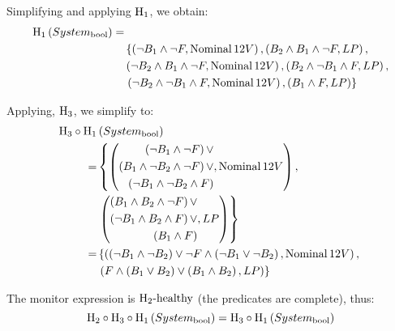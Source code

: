 Simplifying and applying $\healthiness[1]$, we obtain:
%
\[
\begin{split}
\healthinessfun[1]{System_{\mathrm{bool}}} = &\\
  & \left\{ 
      \left(\lnot B_1 \land \lnot F, \Nominal{12V}\right), 
      \left(B_2 \land B_1 \land \lnot F, LP\right),\right.\\
  &   \left(\lnot B_2 \land B_1 \land \lnot F, \Nominal{12V}\right), 
      \left(B_2 \land \lnot B_1 \land F, LP\right), \\
  &   \left.\left(\lnot B_2 \land \lnot B_1 \land F, \Nominal{12V}\right),
      \left(B_1 \land F, LP\right)\right\}
\end{split}
\]

Applying, $\healthiness[3]$, we simplify to:
%
\[
\begin{split}
\healthiness[3] \circ \healthiness[1] &\left(System_{\mathrm{bool}}\right)\\
=  & \left\{ 
      \left(
        \begin{split}
          \left(\lnot B_1 \land \lnot F\right) \lor\\
          \left(B_1 \land \lnot B_2 \land \lnot F \right)\lor \\
          \left(\lnot B_1 \land \lnot B_2 \land F \right)
        \end{split},
        \Nominal{12V}
      \right),
    \right.\\
  & \left.
      \left(
        \begin{split}
        \left(B_1 \land B_2 \land \lnot F\right) \lor \\
        \left(\lnot B_1 \land B_2 \land F\right) \lor \\
        \left(B_1 \land F\right)
        \end{split}, 
        LP
      \right)
    \right\}\\
= & \left\{
    \left(\left(\lnot B_1 \land \lnot B_2\right) \lor 
      \lnot F \land \left(\lnot B_1 \lor \lnot B_2\right), 
      \Nominal{12V}\right), \right.\\
  & \left.  
    \left(F \land \left(B_1 \lor B_2\right) \lor \left(B_1 \land B_2\right), 
      LP\right)
  \right\}
\end{split}
\]

The monitor expression is $\healthy[2]$ (the predicates are complete), thus:
\[
\healthiness[2] \circ \healthiness[3] \circ \healthiness[1]\left(System_{\mathrm{bool}}\right) =
\healthiness[3] \circ \healthiness[1]  \left(System_{\mathrm{bool}}\right)
\]

